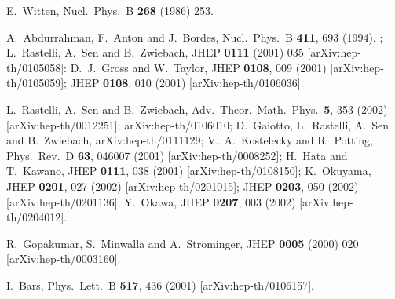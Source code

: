 \documentclass[a4paper,aps,preprint,nofootinbib,eqsecnum]{revtex4}
\begin{document}

\begin{thebibliography}{99}
 {\small E.~Witten,
Nucl.\ Phys.\ B \textbf{268} (1986) 253. %
}

 {\small A.~Abdurrahman, F.~Anton and J.~Bordes,
Nucl.\ Phys.\ B \textbf{411}, 693 (1994). %
;\newline
L.~Rastelli, A.~Sen and B.~Zwiebach, %
JHEP \textbf{0111} (2001) 035 [arXiv:hep-th/0105058]:\newline
D.~J.~Gross and W.~Taylor, %
JHEP \textbf{0108}, 009 (2001) [arXiv:hep-th/0105059];
%
%
JHEP \textbf{0108}, 010 (2001) [arXiv:hep-th/0106036].\newline
%
%
}

 {\small %
}

{\small %
L.~Rastelli, A.~Sen and B.~Zwiebach,
Adv.\ Theor.\ Math.\ Phys.\ \textbf{5}, 353 (2002) [arXiv:hep-th/0012251];
arXiv:hep-th/0106010; \newline
%
%
D.~Gaiotto, L.~Rastelli, A.~Sen and B.~Zwiebach,
arXiv:hep-th/0111129;\newline
%
V.~A.~Kostelecky and R.~Potting,
Phys.\ Rev.\ D \textbf{63}, 046007 (2001) [arXiv:hep-th/0008252];\newline
%
H.~Hata and T.~Kawano,
JHEP \textbf{0111}, 038 (2001) [arXiv:hep-th/0108150];\newline
K.~Okuyama, %
JHEP \textbf{0201}, 027 (2002) [arXiv:hep-th/0201015]; %
JHEP \textbf{0203}, 050 (2002) [arXiv:hep-th/0201136];\newline
%
Y.~Okawa,
JHEP \textbf{0207}, 003 (2002) [arXiv:hep-th/0204012].
}

 {\small R.~Gopakumar, S.~Minwalla and A.~Strominger,
JHEP \textbf{0005} (2000) 020 [arXiv:hep-th/0003160].
}

 {\small I.~Bars, %
Phys.\ Lett.\ B \textbf{517}, 436 (2001) [arXiv:hep-th/0106157].
}


\end{thebibliography}
\end{document}
